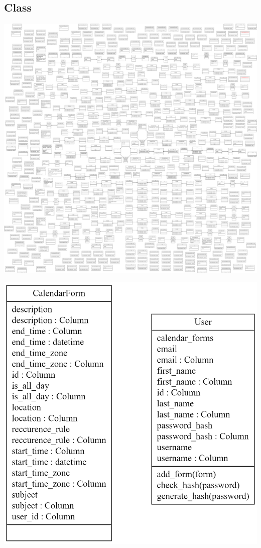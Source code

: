 \subsection{Class}
\par
\includegraphics[width=\textwidth]{ClassDigram}
\par
\includegraphics[width=\textwidth]{ClassDigram2}
